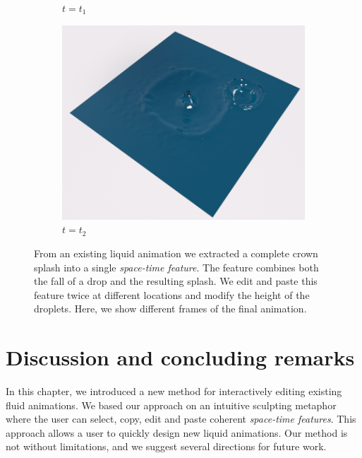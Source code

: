 \begin{figure}[!h]
\begin{subfigure}[b]{0.3\linewidth}
		\caption{\label{fig:result_trajectory:t1}$t=t_{1}$}
	\end{subfigure}
	\hspace{0.1cm}
	\begin{subfigure}[b]{0.3\linewidth}
		\centering
		\includegraphics[width=\textwidth]{images/fluidsculpting-mig2016/results/two_drops_2.png}
		\caption{\label{fig:result_trajectory:t2}$t=t_{2}$}
	\end{subfigure}
	\caption[Fluid sculpting: Droplets]{From an existing liquid animation we extracted a complete crown splash into a single \emph{space-time feature}. The feature combines both the fall of a drop and the resulting splash. We edit and paste this feature twice at different locations and modify the height of the droplets. Here, we show different frames of the final animation.
	}
	\label{fig:result_trajectory}
\end{figure}

\newpage 

\section{Discussion and concluding remarks} \label{sec:fluidsculpting:discussion}

In this chapter, we introduced a new method for interactively editing existing fluid animations. We based our approach on an intuitive sculpting metaphor where the user can select, copy, edit and paste coherent \emph{space-time features}. 
This approach allows a user to quickly design new liquid animations. 
Our method is not without limitations, and we suggest several directions for future work.

